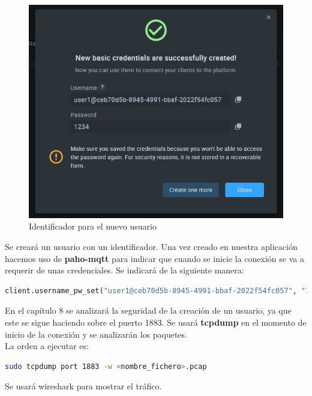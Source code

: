 {\begin{figure}[p]
    \centering
    \includegraphics[width=\linewidth]{imagenes/Captura de pantalla 2022-06-13 180337.png}
    \caption{Identificador para el nuevo usuario}
    \label{fig:figure12-imp}
\end{figure}

Se creará un usuario con un identificador. Una vez creado en nuestra aplicación hacemos uso de \textbf{paho-mqtt} para indicar que cuando se inicie la conexión se va a requerir de unas credenciales. Se indicará de la siguiente manera:


\begin{lstlisting}[language=Python]
client.username_pw_set("user1@ceb70d5b-8945-4991-bbaf-2022f54fc057", "1234")
\end{lstlisting}

En el capítulo 8 se analizará la seguridad de la creación de un usuario, ya que este se sigue haciendo sobre el puerto 1883. Se usará \textbf{tcpdump} en el momento de inicio de la conexión y se analizarán los paquetes. \\

La orden a ejecutar es:

\begin{lstlisting}[language=bash]
sudo tcpdump port 1883 -w <nombre_fichero>.pcap
\end{lstlisting}

Se usará wireshark para mostrar el tráfico.


}